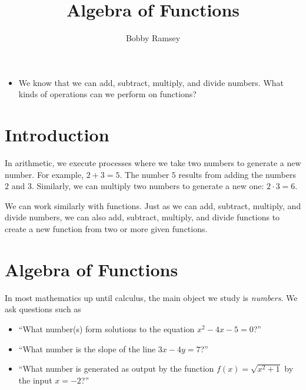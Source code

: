 \documentclass{ximera}
\author{Bobby Ramsey}
\title{Algebra of Functions}
\begin{document}
\begin{abstract}
  
\end{abstract}
\licenseAPC
\maketitle


\begin{motivatingQuestions} 
	\begin{itemize}
		\item We know that we can add, subtract, multiply, and divide numbers. What kinds of operations can we perform on functions?
	\end{itemize} 
\end{motivatingQuestions}



\section{Introduction}

	In arithmetic, we execute processes where we take two numbers to generate a new number. For example, 
	$2 + 3 = 5$. The number $5$ results from adding the numbers $2$ and $3$.
	Similarly, we can multiply two numbers to generate a new one: $2 \cdot 3 = 6$.
	
	We can work similarly with functions. Just as we can add, subtract, multiply, and divide numbers, we can also add, subtract, multiply, and divide 
	functions to create a new function from two or more given functions.

\section{Algebra of Functions}

	In most mathematics up until calculus, the main object we study is \emph{numbers}. We ask questions such as
	\begin{itemize}
		\item ``What number(s) form solutions to the equation $x^2 - 4x - 5 = 0$?''\\
		\item ``What number is the slope of the line $3x - 4y = 7$?''\\
		\item ``What number is generated as output by the function $f(x) = \sqrt{x^2 + 1}$ by the input $x = -2$?''
	\end{itemize}
	
\end{document}

